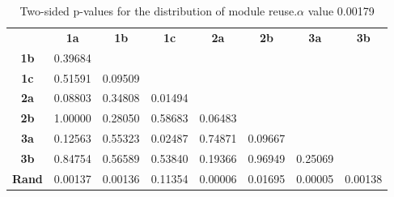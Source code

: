 \begin{table}[h!]
    \centering
    \begin{tabular}{cccccccc}
                              & \textbf{1a} & \textbf{1b} & \textbf{1c}  & \textbf{2a} & \textbf{2b} & \textbf{3a} & \textbf{3b} \\
    \textbf{1b}               & 0.39684 &         &         &         &         &         &         \\
    \textbf{1c}               & 0.51591 & 0.09509 &         &         &         &         &         \\
    \textbf{2a}               & 0.08803 & 0.34808 & 0.01494 &         &         &         &         \\
    \textbf{2b}               & 1.00000 & 0.28050 & 0.58683 & 0.06483 &         &         &         \\
    \textbf{3a}               & 0.12563 & 0.55323 & 0.02487 & 0.74871 & 0.09667 &         &         \\
    \textbf{3b}               & 0.84754 & 0.56589 & 0.53840 & 0.19366 & 0.96949 & 0.25069 &         \\
    \textbf{Rand}             & 0.00137 & 0.00136 & 0.11354 & 0.00006 & 0.01695 & 0.00005 & 0.00138
    \end{tabular}
    \caption[Experiment 2: p-table for module reuse]{Two-sided p-values for the distribution of module reuse.\(\alpha\) value 0.00179}
    \label{tab:exp2.reuseptable}
\end{table}